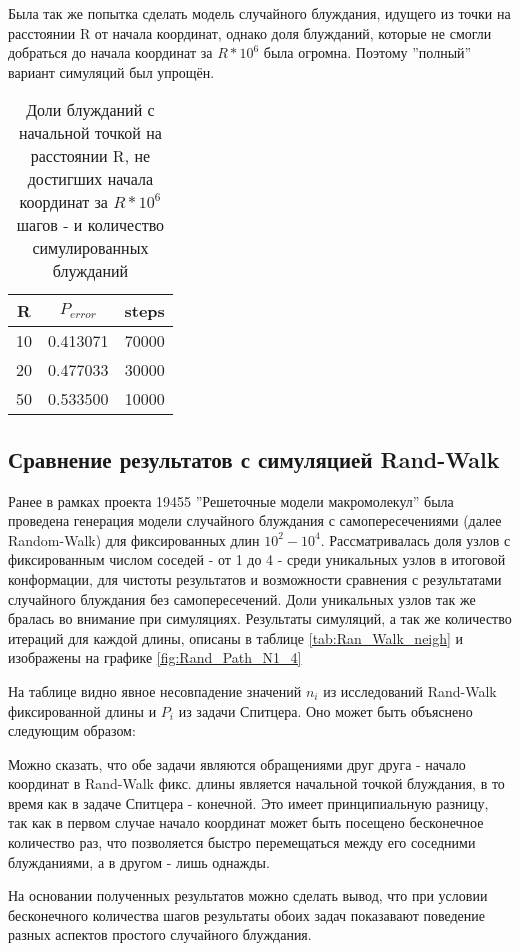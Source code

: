 Была так же попытка сделать модель случайного блуждания, идущего из точки на расстоянии R от начала координат, однако доля блужданий, 
которые не смогли добраться до начала координат за $R * 10^6$ была огромна. Поэтому ''полный'' вариант симуляций был упрощён.

\begin{table}[h!]
    \centering
    \begin{tabular}{|c|c|c|}
        \hline
        R & $P_{error}$ & steps \\ \hline
        10 & 0.413071 & 70000  \\ \hline
		20 & 0.477033 & 30000 \\ \hline
		50 & 0.533500 & 10000  \\ \hline
    \end{tabular}
    \caption{Доли блужданий с начальной точкой на расстоянии R, не достигших начала координат за $R * 10^6$ шагов - и количество симулированных блужданий}
    \label{tab:spitser_res_full}
\end{table}


\subsection{Сравнение результатов с симуляцией Rand-Walk}

Ранее в рамках проекта 19455 ''Решеточные модели макромолекул'' была проведена генерация модели случайного блуждания с самопересечениями 
(далее Random-Walk) для фиксированных длин $10^{2}-10^{4}$. 
Рассматривалась доля узлов с фиксированным числом соседей - от 1 до 4 - среди уникальных узлов в итоговой конформации, для чистоты результатов и 
возможности сравнения с результатами случайного блуждания без самопересечений. Доли уникальных узлов так же бралась во внимание при симуляциях. 
Результаты симуляций, а так же количество итераций для каждой длины, описаны в таблице \ref{tab:Ran_Walk_neigh} и изображены на графике \ref{fig:Rand_Path_N1_4}

На таблице видно явное несовпадение значений $n_{i}$ из исследований Rand-Walk фиксированной длины и $P_i$ из задачи Спитцера. 
Оно может быть объяснено следующим образом:

Можно сказать, что обе задачи являются обращениями друг друга - начало координат в Rand-Walk фикс. длины является начальной точкой блуждания, 
в то время как в задаче Спитцера - конечной. Это имеет принципиальную разницу, так как в первом случае начало координат может быть посещено бесконечное
количество раз, что позволяется быстро перемещаться между его соседними блужданиями, а в другом - лишь однажды.

На основании полученных результатов можно сделать вывод, что при условии бесконечного количества шагов результаты обоих задач показавают поведение разных
аспектов простого случайного блуждания.




